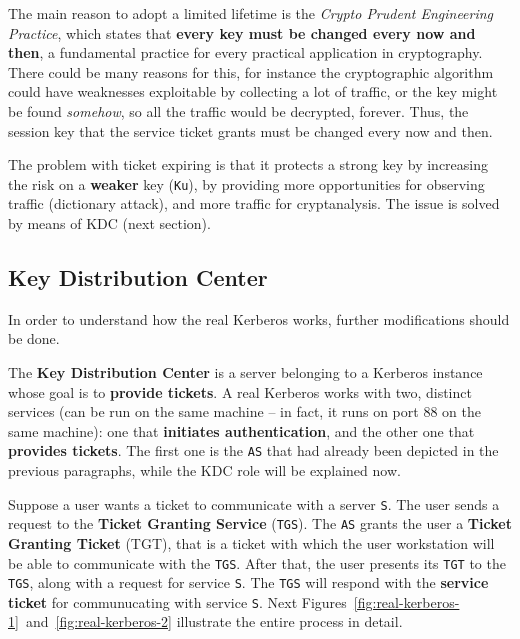 \documentclass[10pt]{extbook}
\begin{document}
The main reason to adopt a limited lifetime is the \emph{Crypto Prudent
Engineering Practice}, which states that \textbf{every key must be changed
every now and then}, a fundamental practice for every practical application in
cryptography. There could be many reasons for this, for instance the
cryptographic algorithm could have weaknesses exploitable by collecting a lot
of traffic, or the key might be found \emph{somehow}, so all the traffic would
be decrypted, forever. Thus, the session key that the service ticket grants
must be changed every now and then.

The problem with ticket expiring is that it protects a strong key by increasing
the risk on a \textbf{weaker} key (\texttt{Ku}), by providing more
opportunities for observing traffic (dictionary attack), and more traffic for
cryptanalysis. The issue is solved by means of KDC (next section).

\subsection{Key Distribution Center}

In order to understand how the real Kerberos works, further modifications
should be done.

The \textbf{Key Distribution Center} is a server belonging to a Kerberos instance
whose goal is to \textbf{provide tickets}. A real Kerberos works with two,
distinct services (can be run on the same machine -- in fact, it runs on port
88 on the same machine): one that \textbf{initiates authentication}, and the
other one that \textbf{provides tickets}. The first one is the \texttt{AS} that
had already been depicted in the previous paragraphs, while the KDC role will
be explained now.

Suppose a user wants a ticket to communicate with a server \texttt{S}. The user
sends a request to the \textbf{Ticket Granting Service} (\texttt{TGS}). The
\texttt{AS} grants the user a \textbf{Ticket Granting Ticket} (TGT), that is a
ticket with which the user workstation will be able to communicate with the
\texttt{TGS}. After that, the user presents its \texttt{TGT} to the
\texttt{TGS}, along with a request for service \texttt{S}. The \texttt{TGS}
will respond with the \textbf{service ticket} for communucating with service
\texttt{S}. Next
Figures~\ref{fig:real-kerberos-1}~and~\ref{fig:real-kerberos-2} illustrate the
entire process in detail.
\end{document}
